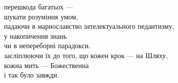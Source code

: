перешкода багатьох ---\\
шукати розуміння умом,\\
падаючи в марнославство інтелектуального педантизму,\\
у накопичення знань\\
чи в непереборні парадокси.\\
засліплюючи їх до того, що кожен крок --- на Шляху,\\
кожна мить --- Божественна\\
і так було завжди.\\
